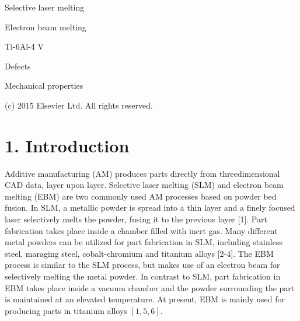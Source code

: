 \documentclass[10pt]{article}
\begin{document}
Selective laser melting

Electron beam melting

Ti-6Al-4 V

Defects

Mechanical properties

\begin{abstract}
A B S T R A C T This study evaluates the mechanical properties of Ti-6Al-4 V samples produced by selective laser melting (SLM) and electron beam melting (EBM). Different combinations of process parameters with varying energy density levels were utilized to produce samples, which were analyzed for defects and subjected to hardness, tensile, and fatigue tests. In SLM samples, small pores in amounts up to 1 vol.\% resulting from an increase in energy density beyond the optimum level were found to have no major detrimental effect on the mechanical properties. However, further increase in the energy density increased the amount of porosity to 5 vol.\%, leading to considerable drop in tensile properties. Samples produced using lower-than-optimum energy density exhibited unmelted powder defects, which, even at 1 vol.\% level, strongly affected both tensile and fatigue properties. In EBM, insufficient energy input was found to result in large, macroscopic voids, causing serious degradation in all mechanical properties. These findings are helpful in process optimization and standardization of SLM and EBM processes.
\end{abstract}

(c) 2015 Elsevier Ltd. All rights reserved.

\section*{1. Introduction}
Additive manufacturing (AM) produces parts directly from threedimensional CAD data, layer upon layer. Selective laser melting (SLM) and electron beam melting (EBM) are two commonly used AM processes based on powder bed fusion. In SLM, a metallic powder is spread into a thin layer and a finely focused laser selectively melts the powder, fusing it to the previous layer [1]. Part fabrication takes place inside a chamber filled with inert gas. Many different metal powders can be utilized for part fabrication in SLM, including stainless steel, maraging steel, cobalt-chromium and titanium alloys [2-4]. The EBM process is similar to the SLM process, but makes use of an electron beam for selectively melting the metal powder. In contrast to SLM, part fabrication in EBM takes place inside a vacuum chamber and the powder surrounding the part is maintained at an elevated temperature. At present, EBM is mainly used for producing parts in titanium alloys $[1,5,6]$.
\end{document}
